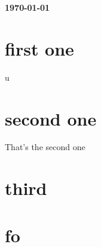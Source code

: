 \documentclass[17pt]{extarticle}
\begin{document}


\begin{flushright}
{\bf \today}
\end{flushright}

\tableofcontents

\clearpage

\section{first one}


u


\section{second one}

That's the second one

\section{third}

\section{fo}
\end{document}
